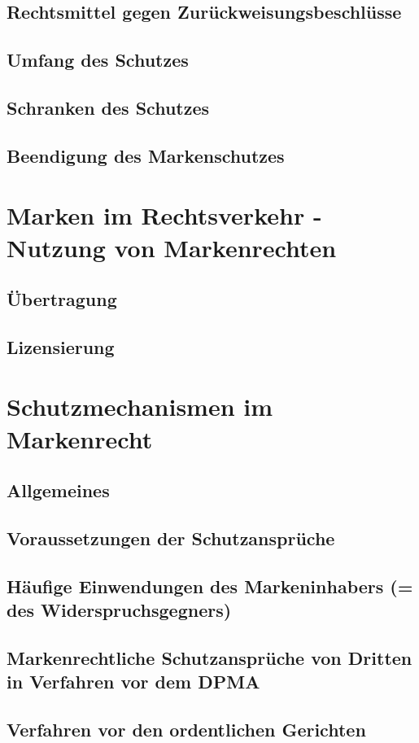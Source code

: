 \documentclass{report}
\begin{document}
\subsection{Rechtsmittel gegen Zurückweisungsbeschlüsse}
\subsection{Umfang des Schutzes}
\subsection{Schranken des Schutzes}
\subsection{Beendigung des Markenschutzes}
\section{Marken im Rechtsverkehr - Nutzung von Markenrechten}
\subsection{Übertragung}
\subsection{Lizensierung}
\section{Schutzmechanismen im Markenrecht}
\subsection{Allgemeines}
\subsection{Voraussetzungen der Schutzansprüche}
\subsection{Häufige Einwendungen des Markeninhabers (= des Widerspruchsgegners)}
\subsection{Markenrechtliche Schutzansprüche von Dritten in Verfahren vor dem DPMA}
\subsection{Verfahren vor den ordentlichen Gerichten}
\end{document}
